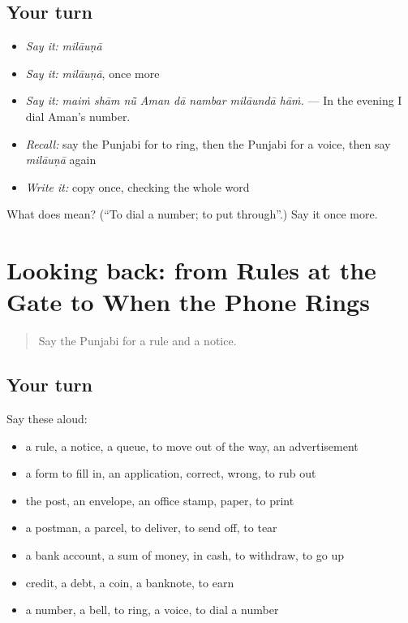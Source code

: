 \subsection*{Your turn}
\begin{itemize}
\raggedright
  \item \emph{Say it:} \emph{milāuṇā}
  \item \emph{Say it:} \emph{milāuṇā}, once more
  \item \emph{Say it:} \emph{maiṁ shām nū̃ Aman dā nambar milāundā hāṁ.} — In the evening I dial Aman's number.
  \item \emph{Recall:} say the Punjabi for to ring, then the Punjabi for a voice, then say \emph{milāuṇā} again
  \item \emph{Write it:} copy \textbf{} once, checking the whole word
\end{itemize}

\begin{tcolorbox}[breakable,colback=teal!4,colframe=teal!35!black,title={Before you move on}]
What does  mean? (\textquotedblleft{}To dial a number; to put through\textquotedblright{}.) Say it once more.
\end{tcolorbox}
\section[(dialogue)]{Looking back: from Rules at the Gate to When the Phone Rings}

\label{lesson:PA-R259-review-253-259}



\begin{quote}
Say the Punjabi for a rule and a notice.
\end{quote}

\subsection*{Your turn}
Say these aloud:

\begin{itemize}
\raggedright
  \item a rule, a notice, a queue, to move out of the way, an advertisement
  \item a form to fill in, an application, correct, wrong, to rub out
  \item the post, an envelope, an office stamp, paper, to print
  \item a postman, a parcel, to deliver, to send off, to tear
  \item a bank account, a sum of money, in cash, to withdraw, to go up
  \item credit, a debt, a coin, a banknote, to earn
  \item a number, a bell, to ring, a voice, to dial a number
\end{itemize}

